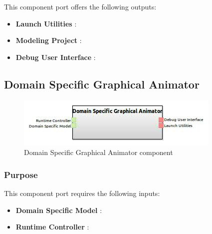 \documentclass{gemoc} %
\begin{document}
This component port offers the following outputs:
\begin{itemize}
  \item \textbf{Launch Utilities} :
  \item \textbf{Modeling Project} :
  \item \textbf{Debug User Interface} :
\end{itemize}

\subsection{Domain Specific Graphical Animator}

\begin{figure}[htp]
	\begin{center}
	\includegraphics*[trim=0.0cm 0.0cm 0cm 0.0cm, clip=true, scale=1.0]{../images/generated/Generated_Domain Specific Graphical Animator.jpg}
	\caption{Domain Specific Graphical Animator component}
	\end{center}
\end{figure}

\subsubsection{Purpose}

This component port requires the following inputs:
\begin{itemize}
  \item \textbf{Domain Specific Model} :
  \item \textbf{Runtime Controller} :
\end{itemize}
\end{document}

